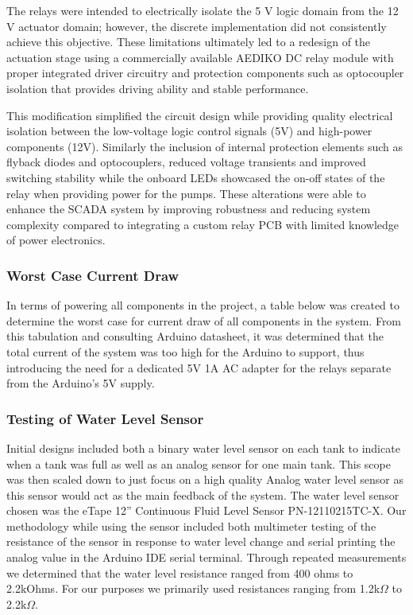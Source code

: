 \documentclass[../main.tex]{subfiles}
\begin{document}
The relays were intended to electrically isolate the 5 V logic domain from the 12 V actuator domain; however, the discrete implementation did not consistently achieve this objective. These limitations ultimately led to a redesign of the actuation stage using a commercially available AEDIKO DC relay module with proper integrated driver circuitry and protection components such as optocoupler isolation that provides driving ability and stable performance. 

This modification simplified the circuit design while providing quality electrical isolation between the low-voltage logic control signals (5V) and high-power components (12V). Similarly the inclusion of internal protection elements such as flyback diodes and optocouplers, reduced voltage transients and improved switching stability while the onboard LEDs showcased the on-off states of the relay when providing power for the pumps. These alterations were able to enhance the SCADA system by improving robustness and reducing system complexity compared to integrating a custom relay PCB with limited knowledge of power electronics.

\subsubsection{Worst Case Current Draw}
In terms of powering all components in the project, a table below was created to determine the worst case for current draw of all components in the system. From this tabulation and consulting Arduino datasheet, it was determined that the total current of the system was too high for the Arduino to support, thus introducing the need for a dedicated 5V 1A AC adapter for the relays separate from the Arduino’s 5V supply.



\subsubsection{Testing of Water Level Sensor}
Initial designs included both a binary water level sensor on each tank to indicate when a tank was full as well as an analog sensor for one main tank. This scope was then scaled down to just focus on a high quality Analog water level sensor as this sensor would act as the main feedback of the system. The water level sensor chosen was the eTape 12” Continuous Fluid Level Sensor PN-12110215TC-X. Our methodology while using the sensor included both multimeter testing of the resistance of the sensor in response to water level change and serial printing the analog value in the Arduino IDE serial terminal. Through repeated measurements we determined that the water level resistance ranged from 400 ohms to 2.2kOhms. For our purposes we primarily used resistances ranging from 1.2k$\Omega$ to 2.2k$\Omega$.
\end{document}
